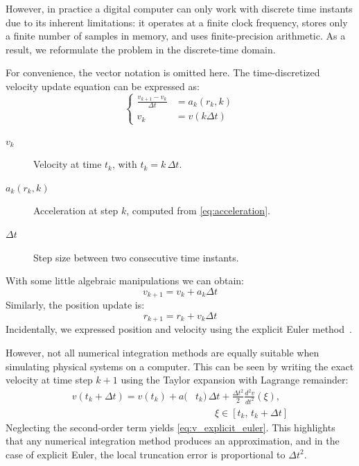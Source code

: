 \documentclass{article}
\begin{document}
However, in practice a digital computer can only work with discrete time instants due to its inherent limitations: it operates at a finite clock frequency, stores only a finite number of samples in memory, and uses finite-precision arithmetic. As a result, we reformulate the problem in the discrete-time domain.

For convenience, the vector notation is omitted here. The time-discretized velocity update equation can be expressed as:
\begin{equation} %
\left\{
\begin{aligned}
\frac{v_{k+1}-v_k}{\Delta t} &= a_k(r_k, k) \\
v_k &=v(k \Delta t)
\end{aligned}
\right.
\end{equation}
\begin{description}
\item[$v_k$] Velocity at time $t_k$, with $t_k = k \, \Delta t$.
\item[$a_k(r_k, k)$] Acceleration at step $k$, computed from \eqref{eq:acceleration}.
\item[$\Delta t$] Step size between two consecutive time instants.
\end{description}
With some little algebraic manipulations we can obtain:
\begin{equation}
v_{k+1}=v_k+a_k\Delta t
\label{eq:v_explicit_euler}
\end{equation}
Similarly, the position update is:
\begin{equation}
r_{k+1}=r_k+v_k\Delta t
\label{eq:r_explicit_euler}
\end{equation}
Incidentally, we expressed position and velocity using the explicit Euler method~\cite{atkinson1989introduction}.

However, not all numerical integration methods are equally suitable when simulating physical systems on a computer. This can be seen by writing the exact velocity at time step $k+1$ using the Taylor expansion with Lagrange remainder:
\begin{equation}
\begin{aligned}
v(t_k+\Delta t) = v(t_k) + a(&t_k)\,\Delta t
+ \frac{\Delta t^2}{2} \frac{d^2 v}{dt^2}(\xi), \\
&\qquad \xi \in \left[ t_k,\, t_k+\Delta t \right]
\end{aligned}
\label{eq:v_taylor}
\end{equation}
Neglecting the second-order term yields \eqref{eq:v_explicit_euler}. This highlights that any numerical integration method produces an approximation, and in the case of explicit Euler, the local truncation error is proportional to $\Delta t^2$.
\end{document}
